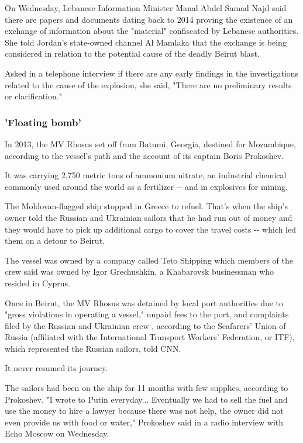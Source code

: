 On Wednesday, Lebanese Information Minister Manal Abdel Samad Najd said
there are papers and documents dating back to 2014 proving the existence
of an exchange of information about the "material" confiscated by
Lebanese authorities. She told Jordan's state-owned channel Al Mamlaka
that the exchange is being considered in relation to the potential cause
of the deadly Beirut blast.

Asked in a telephone interview if there are any early findings in the
investigations related to the cause of the explosion, she said, "There
are no preliminary results or clarification."

\hypertarget{floating-bomb}{%
\subsubsection{'Floating bomb'}\label{floating-bomb}}

In 2013, the MV Rhosus set off from Batumi, Georgia, destined for
Mozambique, according to the vessel's path and the account of its
captain Boris Prokoshev.

It was carrying 2,750 metric tons of ammonium nitrate, an industrial
chemical commonly used around the world as a fertilizer -\/- and in
explosives for mining.

The Moldovan-flagged ship stopped in Greece to refuel. That's when the
ship's owner told the Russian and Ukrainian sailors that he had run out
of money and they would have to pick up additional cargo to cover the
travel costs -\/- which led them on a detour to Beirut.

The vessel was owned by a company called Teto Shipping which members of
the crew said was owned by Igor Grechushkin, a Khabarovsk businessman
who resided in Cyprus.

Once in Beirut, the MV Rhosus was detained by local port authorities due
to "gross violations in operating a vessel," unpaid fees to the port,
and complaints filed by the Russian and Ukrainian crew , according to
the Seafarers' Union of Russia (affiliated with the International
Transport Workers' Federation, or ITF), which represented the Russian
sailors, told CNN.

It never resumed its journey.

The sailors had been on the ship for 11 months with few supplies,
according to Prokoshev. "I wrote to Putin everyday... Eventually we had
to sell the fuel and use the money to hire a lawyer because there was
not help, the owner did not even provide us with food or water,"
Prokoshev said in a radio interview with Echo Moscow on Wednesday.

